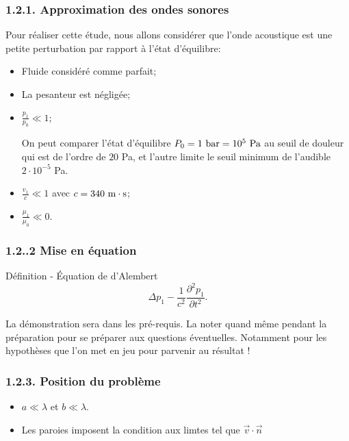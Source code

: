 \documentclass[french, a4paper, 10pt, twocolumn, landscape]{article}
\begin{document}
\subsubsection*{1.2.1. Approximation des ondes sonores}
Pour réaliser cette étude, nous allons considérer que l'onde acoustique est une petite perturbation par rapport à l'état d'équilibre:
\begin{itemize}
	\item Fluide considéré comme parfait;
	\item La pesanteur est négligée;
	\item $\frac{p_1}{p_0}\ll 1$;

\noindent On peut comparer l'état d'équilibre $P_0= 1~\rm bar = 10^5~\rm Pa$ au seuil de douleur qui est de l'ordre de $20$ Pa, et l'autre limite le seuil minimum de l'audible $2\cdot 10^{-5}$ Pa.
	\item  $\frac{v_1}{c}\ll 1$ avec $c=340~\rm m\cdot s$;
	\item $\frac{\mu_1}{\mu_0}\ll 0$.
\end{itemize}

\subsubsection*{1.2..2 Mise en équation}

\begin{definition}{Définition - Équation de d'Alembert}
	\begin{equation}
		\Delta p_1 -\frac{1}{c^2}\frac{\partial^2 p_1}{\partial t^2}.
	\end{equation}
\end{definition}
La démonstration sera dans les pré-requis. La noter quand même pendant la préparation pour se préparer aux questions éventuelles. Notamment pour les hypothèses que l'on met en jeu pour parvenir au résultat ! 

\subsubsection*{1.2.3. Position du problème}


\begin{itemize}
	\item $a\ll\lambda$ et $b\ll \lambda$.
	\item Les paroies imposent la condition aux limtes tel que $\vec{v}\cdot \vec{n}$
\end{itemize}
\end{document}
